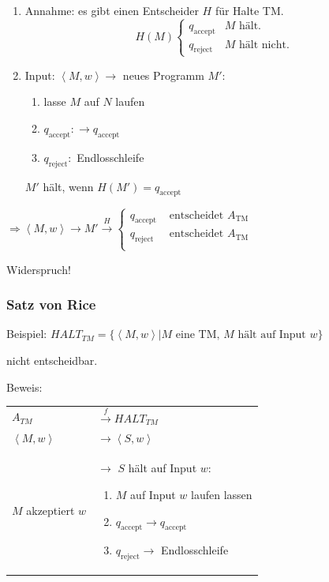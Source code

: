 \begin{enumerate}
	\item Annahme: es gibt einen Entscheider $H$ für Halte TM. \[
		H(M) \begin{cases}
			q_\text{accept} & M \text{ hält.}\\
			q_\text{reject} & M \text{ hält nicht.}
		\end{cases}
	\]
	\item	Input: $\left<M,w\right> \longrightarrow$ neues Programm $M'$: \begin{enumerate}
			\item lasse $M$ auf $N$ laufen
			\item $q_\text{accept}: \rightarrow q_\text{accept}$
			\item $q_\text{reject}:$ Endlosschleife
		\end{enumerate}
		$M'$ hält, wenn $H(M') = q_\text{accept}$
	
\end{enumerate}

$\Rightarrow \left<M,w\right> \longrightarrow M' \xrightarrow{ H } \begin{cases}
	q_\text{accept} & \text{ entscheidet } A_\text{TM}\\
	q_\text{reject} & \text{ entscheidet } A_\text{TM}\\
\end{cases}$ \Lightning

Widerspruch!


\subsubsection{Satz von Rice}

Beispiel: $HALT_{TM} = \{ \left<M,w\right> | M \text{ eine TM, } M \text{ hält auf Input } w \}$

nicht entscheidbar.

Beweis:

\begin{tabu}{l X}
	$A_{TM}$ &$\xrightarrow{f} HALT_{TM}$ \\
	$\left<M,w\right>$ &$\rightarrow \left<S,w\right>$ \\
	$M$ akzeptiert $w$ & $\rightarrow$ $S$ hält auf Input $w$: \begin{enumerate}
		\item $M$ auf Input $w$ laufen lassen
		\item $q_\text{accept} \rightarrow q_\text{accept}$
		\item $q_\text{reject} \rightarrow$ Endlosschleife
		\end{enumerate}
\end{tabu}

